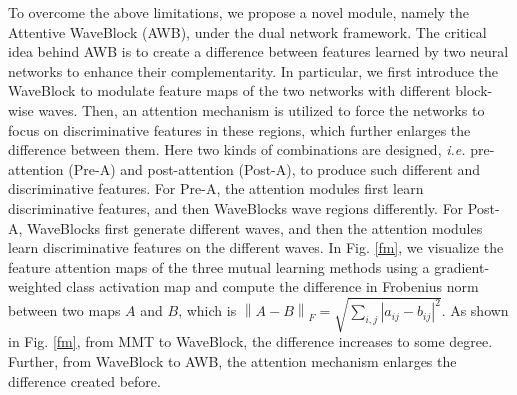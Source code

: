 \documentclass[journal]{IEEEtran}
\begin{document}
\begin{figure*}
\centering
{}
\centering
\caption{The gradient-weighted class activation maps of MMT \cite{ge2020mutual}, WaveBlock, and AWB. The differences in Frobenius norm between two maps for the three methods are $1.58$, $2.04$ and $4.83$, respectively. For MMT \cite{ge2020mutual}, the “focus” of the two networks is similar, and the activated areas are not very discriminative (not covering the full body and some are on the background). When using WaveBlock, the “focus” of the two networks becomes different. By combining attention modules with WaveBlock, the difference becomes even larger, and the activated areas of one network cover most of the body while the activated areas of another cover important points.}
\label{fm}
\end{figure*}
To overcome the above limitations, we propose a novel module, namely the Attentive WaveBlock (AWB), under the dual network framework. The critical idea behind AWB is to create a difference between features learned by two neural networks to enhance their complementarity. In particular, we first introduce the WaveBlock to modulate feature maps of the two networks with different block-wise waves. Then, an attention mechanism is utilized to force the networks to focus on discriminative features in these regions, which further enlarges the difference between them. Here two kinds of combinations are designed, \textit{i.e.} pre-attention (Pre-A) and post-attention (Post-A), to produce such different and discriminative features. For Pre-A, the attention modules first learn discriminative features, and then WaveBlocks wave regions differently. For Post-A, WaveBlocks first generate different waves, and then the attention modules learn discriminative features on the different waves. In Fig. \ref{fm}, we visualize the feature attention maps of the three mutual learning methods using a gradient-weighted class activation map \cite{selvaraju2017grad} and compute the difference in Frobenius norm between two maps $A$ and $B$, which is ${\left\| {A - B} \right\|_F} = \sqrt {\sum\nolimits_{i,j} {{{\left| {{a_{ij}} - {b_{ij}}} \right|}^2}} } $. As shown in Fig. \ref{fm}, from MMT \cite{ge2020mutual} to WaveBlock, the difference increases to some degree. Further, from WaveBlock to AWB, the attention mechanism enlarges the difference created before.
\end{document}
